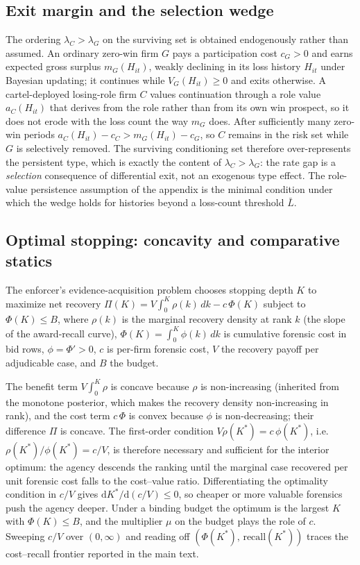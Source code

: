 \subsection{Exit margin and the selection wedge}
\label{supp:theory_exit}

The ordering $\lambda_C>\lambda_G$ on the surviving set is obtained
endogenously rather than assumed. An ordinary zero-win firm $G$ pays a
participation cost $c_G>0$ and earns expected gross surplus
$m_G(H_{it})$, weakly declining in its loss history $H_{it}$ under
Bayesian updating; it continues while $V_G(H_{it})\ge 0$ and exits
otherwise. A cartel-deployed losing-role firm $C$ values continuation
through a role value $a_C(H_{it})$ that derives from the role rather
than from its own win prospect, so it does not erode with the loss count
the way $m_G$ does. After sufficiently many zero-win periods
$a_C(H_{it})-c_C>m_G(H_{it})-c_G$, so $C$ remains in the risk set while
$G$ is selectively removed. The surviving conditioning set therefore
over-represents the persistent type, which is exactly the content of
$\lambda_C>\lambda_G$: the rate gap is a \emph{selection} consequence of
differential exit, not an exogenous type effect. The role-value
persistence assumption of the appendix is the minimal condition under
which the wedge holds for histories beyond a loss-count threshold
$\bar L$.

\subsection{Optimal stopping: concavity and comparative statics}
\label{supp:theory_stopping}

The enforcer's evidence-acquisition problem chooses stopping depth $K$
to maximize net recovery
$\Pi(K)=V\!\int_0^{K}\rho(k)\,dk-c\,\Phi(K)$ subject to $\Phi(K)\le B$,
where $\rho(k)$ is the marginal recovery density at rank $k$ (the slope
of the award-recall curve), $\Phi(K)=\int_0^K\phi(k)\,dk$ is cumulative
forensic cost in bid rows, $\phi=\Phi'>0$, $c$ is per-firm forensic
cost, $V$ the recovery payoff per adjudicable case, and $B$ the budget.

The benefit term $V\!\int_0^K\rho$ is concave because $\rho$ is
non-increasing (inherited from the monotone posterior, which makes the
recovery density non-increasing in rank), and the cost term $c\,\Phi$ is
convex because $\phi$ is non-decreasing; their difference $\Pi$ is
concave. The first-order condition $V\rho(K^{*})=c\,\phi(K^{*})$, i.e.
$\rho(K^{*})/\phi(K^{*})=c/V$, is therefore necessary and sufficient for
the interior optimum: the agency descends the ranking until the marginal
case recovered per unit forensic cost falls to the cost--value ratio.
Differentiating the optimality condition in $c/V$ gives
$\mathrm{d}K^{*}/\mathrm{d}(c/V)\le 0$, so cheaper or more valuable
forensics push the agency deeper. Under a binding budget the optimum is
the largest $K$ with $\Phi(K)\le B$, and the multiplier $\mu$ on the
budget plays the role of $c$. Sweeping $c/V$ over $(0,\infty)$ and
reading off $(\Phi(K^{*}),\,\mathrm{recall}(K^{*}))$ traces the
cost--recall frontier reported in the main text.

